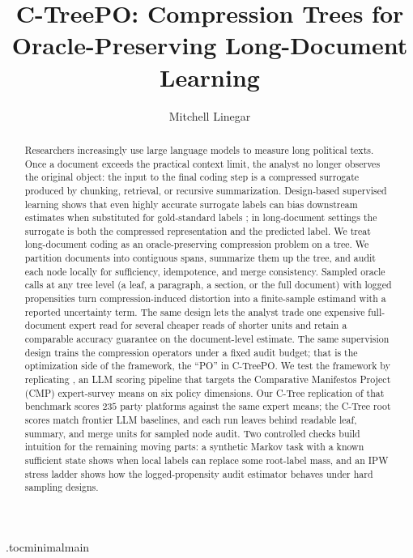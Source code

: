 \documentclass[11pt]{article}
\title{C-TreePO: Compression Trees for Oracle-Preserving Long-Document Learning}
\author{Mitchell Linegar}
\date{}
\begin{document}
\maketitle

\begin{abstract}
Researchers increasingly use large language models to measure long
political texts. Once a document exceeds the practical context
limit, the analyst no longer observes the original object: the
input to the final coding step is a compressed surrogate produced by
chunking, retrieval, or recursive summarization. Design-based
supervised learning shows that even highly accurate surrogate labels
can bias downstream estimates when substituted for gold-standard
labels \citep{EgamiEtAl2024}; in long-document settings the
surrogate is both the compressed representation and the predicted
label. We treat long-document coding as an
oracle-preserving compression problem on a tree. We partition
documents into contiguous spans, summarize them up the tree, and
audit each node locally for sufficiency, idempotence, and merge
consistency. Sampled oracle calls at any tree level (a leaf, a
paragraph, a section, or the full document) with logged propensities
turn compression-induced distortion into a finite-sample estimand
with a reported uncertainty term. The same design lets the analyst trade
one expensive full-document expert read for several cheaper reads of
shorter units and retain a comparable accuracy guarantee on the
document-level estimate. The same supervision design trains the
compression operators under a fixed audit budget; that is the
optimization side of the framework, the ``PO'' in C-TreePO. We test
the framework by replicating \citet{BenoitEtAl2025}, an LLM scoring
pipeline that targets the Comparative Manifestos Project (CMP)
expert-survey means on six policy dimensions. Our C-Tree replication
of that benchmark scores \(235\) party platforms against the same
expert means; the C-Tree root scores match frontier LLM baselines,
and each run leaves behind readable leaf, summary, and merge units
for sampled node audit. Two controlled checks build intuition for the
remaining moving parts: a synthetic Markov task with a known
sufficient state shows when local labels can replace some root-label
mass, and an IPW stress ladder shows how the logged-propensity audit
estimator behaves under hard sampling designs.
\end{abstract}

\tableofcontents
\clearpage

\etocdepthtag.toc{minimalmain}






\clearpage




\end{document}
